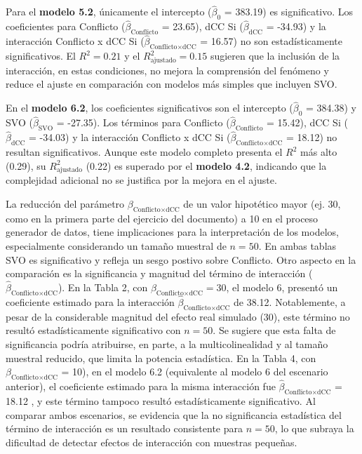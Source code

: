 \documentclass[
  spanish,
  10pt,
]{article}
\begin{document}
Para el \textbf{modelo 5.2}, únicamente el intercepto
(\(\hat{\beta}_{0}\) = 383.19) es significativo. Los coeficientes para
Conflicto (\(\hat{\beta}_{\text{Conflicto}}\) = 23.65), dCC Si
(\(\hat{\beta}_{\text{dCC}}\) = -34.93) y la interacción Conflicto x dCC
Si (\(\hat{\beta}_{\text{Conflicto} \times \text{dCC}}\) = 16.57) no son
estadísticamente significativos. El \(R^2 = 0.21\) y el
\(R^2_{\text{ajustado}} = 0.15\) sugieren que la inclusión de la
interacción, en estas condiciones, no mejora la comprensión del fenómeno
y reduce el ajuste en comparación con modelos más simples que incluyen
SVO.

En el \textbf{modelo 6.2}, los coeficientes significativos son el
intercepto (\(\hat{\beta}_{0}\) = 384.38) y SVO
(\(\hat{\beta}_{\text{SVO}}\) = -27.35). Los términos para Conflicto
(\(\hat{\beta}_{\text{Conflicto}}\) = 15.42), dCC Si
(\(\hat{\beta}_{\text{dCC}}\) = -34.03) y la interacción Conflicto x dCC
Si (\(\hat{\beta}_{\text{Conflicto} \times \text{dCC}}\) = 18.12) no
resultan significativos. Aunque este modelo completo presenta el \(R^2\)
más alto (0.29), su \(R^2_{\text{ajustado}}\) (0.22) es superado por el
\textbf{modelo 4.2}, indicando que la complejidad adicional no se
justifica por la mejora en el ajuste.

La reducción del parámetro
\(\beta_{\text{Conflicto} \times \text{dCC}}\) de un valor hipotético
mayor (ej. 30, como en la primera parte del ejercicio del documento) a
10 en el proceso generador de datos, tiene implicaciones para la
interpretación de los modelos, especialmente considerando un tamaño
muestral de \(n=50\). En ambas tablas SVO es significativo y refleja un
sesgo postivo sobre Conflicto. Otro aspecto en la comparación es la
significancia y magnitud del término de interacción
(\(\hat{\beta}_{\text{Conflicto} \times \text{dCC}}\)). En la Tabla 2,
con \(\beta_{\text{Conflicto} \times \text{dCC}} = 30\), el modelo 6,
presentó un coeficiente estimado para la interacción
\(\hat\beta_{\text{Conflicto} \times \text{dCC}}\) de 38.12.
Notablemente, a pesar de la considerable magnitud del efecto real
simulado (30), este término no resultó estadísticamente significativo
con \(n=50\). Se sugiere que esta falta de significancia podría
atribuirse, en parte, a la multicolinealidad y al tamaño muestral
reducido, que limita la potencia estadística. En la Tabla 4, con
\(\beta_{\text{Conflicto} \times \text{dCC}}\) = 10), en el modelo 6.2
(equivalente al modelo 6 del escenario anterior), el coeficiente
estimado para la misma interacción fue
\(\hat{\beta}_{\text{Conflicto} \times \text{dCC}}\) = 18.12 , y este
término tampoco resultó estadísticamente significativo. Al comparar
ambos escenarios, se evidencia que la no significancia estadística del
término de interacción es un resultado consistente para \(n=50\), lo que
subraya la dificultad de detectar efectos de interacción con muestras
pequeñas.
\end{document}
